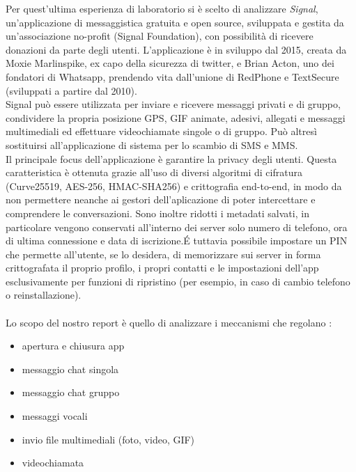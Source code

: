 \documentclass{article}
\begin{document}
   Per quest'ultima esperienza di laboratorio si è scelto di analizzare 
   \textit{Signal}, un'applicazione di messaggistica gratuita e open source, sviluppata e
   gestita da un'associazione no-profit (Signal Foundation), con possibilità di ricevere donazioni da parte degli utenti.
   L'applicazione è in sviluppo dal 2015, creata da Moxie Marlinspike, ex capo della sicurezza di twitter, 
   e Brian Acton, uno dei fondatori di Whatsapp,
   prendendo vita dall'unione di RedPhone e TextSecure (sviluppati a partire dal 2010).\\
   Signal può essere utilizzata per inviare e ricevere messaggi privati e di gruppo, condividere la propria posizione 
   GPS, GIF animate, adesivi, allegati e messaggi multimediali ed effettuare videochiamate singole o di gruppo.
   Può altresì sostituirsi all'applicazione di sistema per lo scambio di SMS e MMS.\\
   Il principale focus dell'applicazione è garantire la privacy degli utenti.
   Questa caratteristica è ottenuta grazie all'uso di diversi algoritmi di cifratura
   (Curve25519, AES-256, HMAC-SHA256) e crittografia end-to-end, in modo da non permettere neanche ai gestori 
   dell'aplicazione di poter intercettare e comprendere le conversazioni. 
   Sono inoltre ridotti i metadati salvati, in particolare 
   vengono conservati all'interno dei server solo numero di telefono, ora di ultima connessione
   e data di iscrizione.\'E tuttavia possibile impostare un PIN che permette all'utente, se lo desidera, di 
   memorizzare sui server in forma crittografata il proprio profilo, i propri contatti 
   e le impostazioni dell'app esclusivamente per funzioni di ripristino (per esempio, in caso di cambio telefono o reinstallazione).\\\\
   Lo scopo del nostro report è quello di analizzare i meccanismi che regolano :

   \begin{itemize}
    \item apertura e chiusura app
    \item messaggio chat singola
    \item messaggio chat gruppo
    \item messaggi vocali
    \item invio file multimediali (foto, video, GIF)
    \item videochiamata
   \end{itemize}
\end{document}

